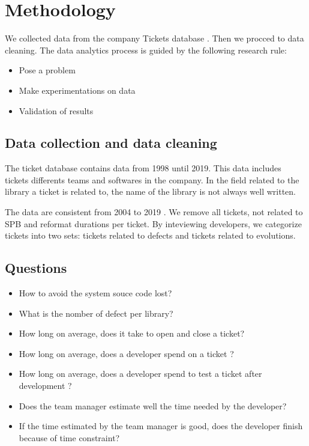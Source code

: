 \documentclass[10pt,conference]{IEEEtran}
\begin{document}
\section{Methodology}\label{sec:methodology}
We collected data  from the company Tickets database .  
Then we procced to data cleaning.
The data analytics process is guided by the following research rule:
\begin{itemize}
\item Pose a problem
\item Make experimentations on data
\item Validation of results
\end{itemize}
\subsection{Data collection and data cleaning}
The ticket database contains data from 1998  until 2019. 
This data includes tickets  differents teams and softwares in  the company. 
In the field related to the  library a ticket is related to,  the name of the library is not always well written. 

The  data are consistent  from 2004 to 2019 . 
We  remove all tickets, not related  to SPB and reformat durations per ticket.
By inteviewing developers, we categorize tickets into two sets: tickets related to defects and tickets related to evolutions.

 \subsection{Questions}
 \begin{itemize}
 \item How to avoid the system souce code lost?
 \item What is the nomber of defect per library?
 \item How long on average, does it take to open and close a ticket?
 \item How long on average,  does a developer spend on a ticket ?
 \item How long on average, does a developer spend to test a ticket after development ?
 \item Does the team manager estimate well  the time needed by the developer?
 \item If the time estimated by the team manager is good, does the developer finish because  of time constraint?
 \end{itemize}
 
\end{document}

